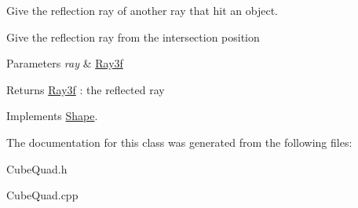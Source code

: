 Give the reflection ray of another ray that hit an object. 

Give the reflection ray from the intersection position 
\begin{DoxyParams}{Parameters}
{\em ray} & \mbox{\hyperlink{class_ray3f}{Ray3f}} \\
\hline
\end{DoxyParams}
\begin{DoxyReturn}{Returns}
\mbox{\hyperlink{class_ray3f}{Ray3f}} \+: the reflected ray 
\end{DoxyReturn}


Implements \mbox{\hyperlink{class_shape_a7cc30a4c8e9564c51f6ab36554aa5cfc}{Shape}}.



The documentation for this class was generated from the following files\+:\begin{DoxyCompactItemize}
\item 
Cube\+Quad.\+h\item 
Cube\+Quad.\+cpp\end{DoxyCompactItemize}
